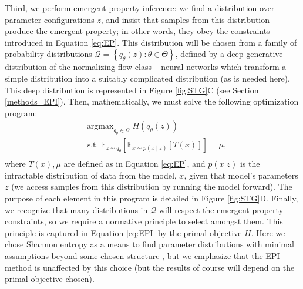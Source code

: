 \documentclass[11pt]{article}
\DeclareMathOperator*{\argmax}{argmax}
\begin{document}
Third, we perform emergent property inference: we find a distribution over parameter configurations $z$, and insist that samples from this distribution produce the emergent property; in other words, they obey the constraints introduced in Equation \ref{eq:EP}.  
This distribution will be chosen from a family of probability distributions $\mathcal{Q} = \left\{ q_\theta(z) : \theta \in \Theta \right\}$, defined by a deep generative distribution
of the normalizing flow class \cite{rezende2015variational, dinh2016density, papamakarios2017masked} -- neural networks which transform a simple distribution into a suitably complicated distribution (as is needed here).  
This deep distribution is represented in Figure \ref{fig:STG}C (see Section \ref{methods_EPI}).  
Then, mathematically, we must solve the following optimization program: 
 \begin{equation} \label{eq:EPI}
\begin{split}
&\argmax_{q_\theta \in \mathcal{Q}} H(q_\theta(z)) \\
 &\text{  s.t.  } \mathbb{E}_{z \sim q_\theta}\left[ \mathbb{E}_{x\sim p(x \mid z)}\left[T(x)\right] \right] = \mu, \\
\end{split}
\end{equation}
where $T(x), \mu$ are defined as in Equation \ref{eq:EP}, and $p(x|z)$ is the intractable distribution of data from the model, $x$, given that model's parameters $z$ (we access samples from this distribution by running the model forward).   The purpose of each element in this program is detailed in Figure \ref{fig:STG}D.
Finally, we recognize that many distributions in $\mathcal{Q}$ will respect the emergent property constraints, so we require a normative principle to select amongst them.  
This principle is captured in Equation \ref{eq:EPI} by the primal objective $H$.  
Here we chose Shannon entropy as a means to find parameter distributions with minimal assumptions beyond some chosen structure \cite{jaynes1957information, elsayed2017structure, loaiza2017maximum, savin2017maximum}, but we emphasize that the EPI method is unaffected by this choice (but the results of course will depend on the primal objective chosen).  
\end{document}
